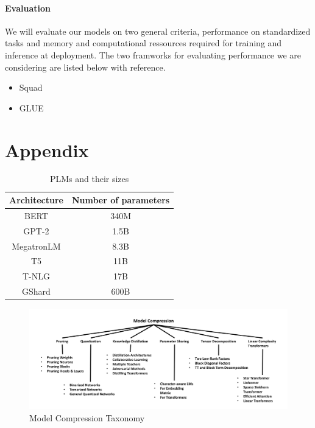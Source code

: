 \documentclass{article}
\begin{document}
\paragraph{Evaluation} We will evaluate our models on two general criteria,
performance on standardized tasks and memory and computational ressources required
for training and inference at deployment. The two framworks for evaluating performance
we are considering are listed below with reference.
\begin{itemize}
  \item Squad\cite{squad}
  \item GLUE\cite{glue}
\end{itemize}


\clearpage



\clearpage
\appendix
\section{Appendix}

\begin{table}[htbp]
\centering
  \begin{tabular}{cc}
    \toprule
    Architecture & Number of parameters\\
    \midrule
    BERT & 340M\\
    GPT-2 & 1.5B\\
    MegatronLM & 8.3B\\
    T5 & 11B\\
    T-NLG & 17B\\
    GShard & 600B\\
    \bottomrule
  \end{tabular}
  \caption{PLMs and their sizes\cite{gupta2020compression}}\label{plmsize}
\end{table}

\begin{figure}[h]
  \centering
  \includegraphics[width=\textwidth]{illustrations/modelcompressiontaxonomy}
  \caption{Model Compression Taxonomy\cite{gupta2020compression}}\label{fig:modelcompression}
\end{figure}
\end{document}
